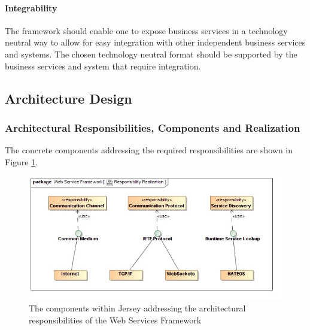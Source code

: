 \paragraph*{Integrability}
The framework should enable one to expose business services in a technology
neutral way to allow for easy integration with other independent business
services and systems.  The chosen technology neutral format should be supported
by the business services and system that require integration.



\subsection{Architecture Design}
\subsubsection{Architectural Responsibilities, Components and Realization}
The concrete components addressing the required responsibilities are shown in Figure \ref{fig:webServicesFrameworkResponsibilityRealization}.
\begin{figure}[H]
	\begin{center}
	\includegraphics[scale=0.5]{../Diagrams and Charts/Web Services Framework/ResponsibilityRealization.jpg}
	\caption{The components within Jersey addressing the architectural responsibilities of the Web Services Framework}
	\label{fig:webServicesFrameworkResponsibilityRealization}
	\end{center}
\end{figure}

